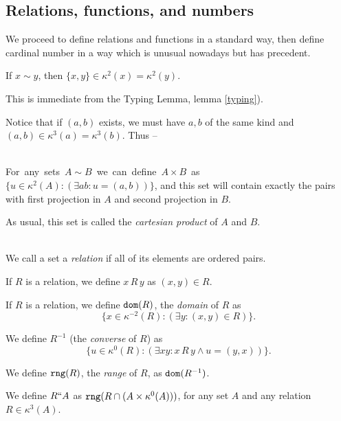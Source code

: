 \documentclass[12pt]{article}
\begin{document}

\subsection{Relations, functions, and numbers}

We proceed to define relations and functions in a standard way, then define cardinal number in a way which is unusual nowadays but has precedent.


\begin{lem} If $x \sim y$, then $\{x,y\} \in \kappa^2(x) = \kappa^2(y)$.  \end{lem} \Proof

This is immediate from the Typing Lemma, lemma \ref{typing}). \endproof


  Notice that if $(a,b)$ exists, we must have $a,b$  of the same kind and $(a,b) \in \kappa^3(a) = \kappa^3(b)$.  Thus --
  \begin{dfn}\mbox{\negthinspace}\\
    \mbox{For any sets $A \sim B$ we can define $A \times B$ as
    $\{u \in \kappa^2(A):(\exists ab:u=(a,b))\}$,} and this set will contain exactly the pairs with first projection in $A$ and second projection in $B$.\end{dfn}

  As usual, this set is called the {\sl cartesian product} of $A$ and $B$.  

  \begin{dfn}\mbox{\negthinspace}\\

    We call a set a {\em relation\/} if all of its elements are ordered pairs.

    If $R$ is a relation, we define $x \, R \, y$ as $(x,y)\in R$.

    If $R$ is a relation, we define ${\tt dom}(R)$, the {\em  domain\/} of $R$ as $$\{x \in \kappa^{-2}(R):(\exists y:(x,y)\in R)\}.$$

    We define $R^{-1}$ (the {\em converse\/} of $R$) as $$\{u \in \kappa^0(R):(\exists xy: x\, R \, y \wedge u = (y,x))\}.$$

    We define ${\tt rng}(R)$, the {\em range\/} of $R$, as ${\tt dom}(R^{-1})$.

    We define $R``A$ as ${\tt rng}(R \cap (A \times \kappa^0(A)))$, for any set $A$ and any relation $R \in \kappa^3(A)$.\end{dfn}
\end{document}
